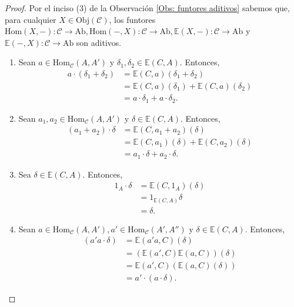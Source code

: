 \documentclass[tesis]{subfiles}
\begin{document}
\begin{proof}\leavevmode
    Por el inciso (3) de la Observación \ref{Obs: funtores aditivos} sabemos que, para cualquier $X\in\text{Obj}(\mathscr{C})$, los funtores $\text{Hom}(X,-):\mathscr{C}\to \text{Ab}, \text{Hom}(-,X):\mathscr{C}\to \text{Ab}, \mathbb{E}(X,-):\mathscr{C}\to \text{Ab}$ y $\mathbb{E}(-,X):\mathscr{C}\to \text{Ab}$ son aditivos.

    \begin{enumerate}[label=(\alph*)]
    
        \item Sean $a\in\text{Hom}_\mathscr{C}(A,A')$ y $\delta_1,\delta_2\in\mathbb{E}(C,A)$. Entonces,
            \begin{align*}
                a\cdot(\delta_1+\delta_2) &= \mathbb{E}(C,a)(\delta_1+\delta_2) \\
                                          &= \mathbb{E}(C,a)(\delta_1)+\mathbb{E}(C,a)(\delta_2) \\
                                          &= a\cdot\delta_1 + a\cdot\delta_2.
            \end{align*}

        \item Sean $a_1,a_2\in\text{Hom}_\mathscr{C}(A,A')$ y $\delta\in\mathbb{E}(C,A)$. Entonces,
            \begin{align*}
                (a_1+a_2)\cdot\delta &= \mathbb{E}(C,a_1+a_2)(\delta) \\
                                     &= \mathbb{E}(C,a_1)(\delta) + \mathbb{E}(C,a_2)(\delta) \\
                                     &= a_1\cdot\delta + a_2\cdot\delta.
            \end{align*}

        \item Sea $\delta\in\mathbb{E}(C,A)$. Entonces,
            \begin{align*}
                1_A\cdot\delta &= \mathbb{E}(C,1_A)(\delta) \\
                               &= 1_{\mathbb{E}(C,A)}\delta \\
                               &= \delta.
            \end{align*}

        \item Sean $a\in\text{Hom}_\mathscr{C}(A,A'), a'\in\text{Hom}_\mathscr{C}(A',A'')$ y $\delta\in\mathbb{E}(C,A)$. Entonces,
            \begin{align*}
                (a'a\cdot\delta) &= \mathbb{E}(a'a,C)(\delta) \\
                                 &= (\mathbb{E}(a',C)\mathbb{E}(a,C))(\delta) \\
                                 &= \mathbb{E}(a',C)(\mathbb{E}(a,C)(\delta)) \\
                                 &= a'\cdot(a\cdot\delta).
            \end{align*}


\end{enumerate}
\end{proof}
\end{document}
